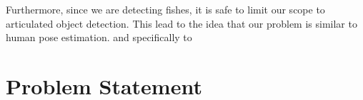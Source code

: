 Furthermore, since we are detecting fishes, it is safe to limit our scope to articulated
object detection. This lead to the idea that our problem is similar to human pose
estimation. and specifically to 



\section{Problem Statement}



